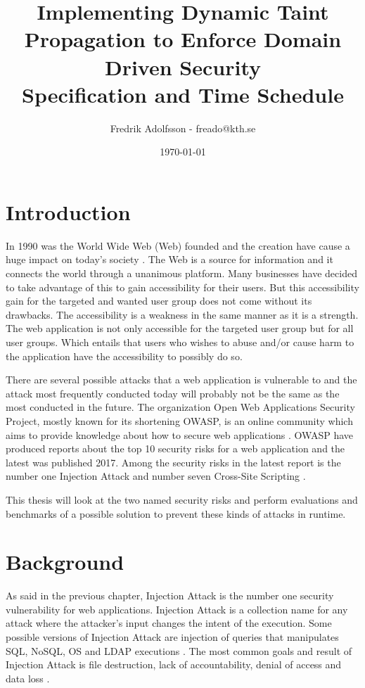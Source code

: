 \documentclass{../kththesis}
\title{Implementing Dynamic Taint Propagation to Enforce Domain Driven Security \\
				\large Specification and Time Schedule}
\author{Fredrik Adolfsson - freado@kth.se}
\date{\today}
\begin{document}
\frontmatter


\titlepage


\tableofcontents


\mainmatter



\chapter{Introduction}
In 1990 was the World Wide Web (Web) founded and the creation have cause a huge impact on today’s society \parencite{www}. The Web is a source for information and it connects the world through a unanimous platform. Many businesses have decided to take advantage of this to gain accessibility for their users. But this accessibility gain for the targeted and wanted user group does not come without its drawbacks. The accessibility is a weakness in the same manner as it is a strength. The web application is not only accessible for the targeted user group but for all user groups. Which entails that users who wishes to abuse and/or cause harm to the application have the accessibility to possibly do so. 

There are several possible attacks that a web application is vulnerable to and the attack most frequently conducted today will probably not be the same as the most conducted in the future. The organization Open Web Applications Security Project, mostly known for its shortening OWASP, is an online community which aims to provide knowledge about how to secure web applications \parencite{OpenWebApplicationSecurityProject}. OWASP have produced reports about the top 10 security risks for a web application and the latest was published 2017. Among the security risks in the latest report is the number one Injection Attack and number seven Cross-Site Scripting \parencite{OWASP2017, OpenWebApplicationSecurityProject, CrossMichael2007Dgtw}.

This thesis will look at the two named security risks and perform evaluations and benchmarks of a possible solution to prevent these kinds of attacks in runtime. 



\chapter{Background}
As said in the previous chapter, Injection Attack is the number one security vulnerability for web applications. Injection Attack is a collection name for any attack where the attacker’s input changes the intent of the execution. Some possible versions of Injection Attack are injection of queries that manipulates SQL, NoSQL, OS and LDAP executions \parencite{OWASP2017}. The most common goals and result of Injection Attack is file destruction, lack of accountability, denial of access and data loss \parencite{Secure_Web}.
\end{document}
